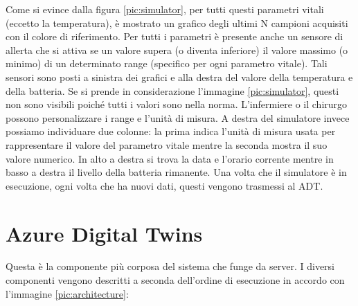 Come si evince dalla figura \ref{pic:simulator}, per tutti questi parametri vitali (eccetto la temperatura), è mostrato un grafico degli ultimi N campioni acquisiti con il colore di riferimento. \newline \newline Per tutti i parametri è presente anche un sensore di allerta che si attiva se un valore supera (o diventa inferiore) il valore massimo (o minimo) di un determinato range (specifico per ogni parametro vitale). Tali sensori sono posti a sinistra dei grafici e alla destra del valore della temperatura e della batteria. Se si prende in considerazione l'immagine \ref{pic:simulator}, questi non sono visibili poiché tutti i valori sono nella norma. L'infermiere o il chirurgo possono personalizzare i range e l'unità di misura. \newline \newline A destra del simulatore invece possiamo individuare due colonne: la prima indica l'unità di misura usata per rappresentare il valore del parametro vitale mentre la seconda mostra il suo valore numerico. In alto a destra si trova la data e l'orario corrente mentre in basso a destra il livello della batteria rimanente.
\newline \newline Una volta che il simulatore è in esecuzione, ogni volta che ha nuovi dati, questi vengono trasmessi al ADT.

\section{Azure Digital Twins}
Questa è la componente più corposa del sistema che funge da server. I diversi componenti vengono descritti a seconda dell'ordine di esecuzione in accordo con l'immagine \ref{pic:architecture}:

